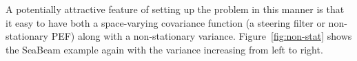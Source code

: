 
A potentially attractive feature of setting up the problem in this
manner is that it easy to have both  a space-varying covariance function
(a steering filter or non-stationary PEF) along with a non-stationary
variance. Figure~\ref{fig:non-stat} shows the SeaBeam example
again with the variance increasing from left to right.

